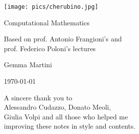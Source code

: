 \documentclass[preview,12pt]{article}
\begin{document}
\begin{titlepage}
\begin{center}
\vspace{3cm}

\Large

\vspace{2cm}

\texttt{[image: pics/cherubino.jpg]}

\vspace{2.5cm}

{\Huge \sc Computational Mathematics}

\vspace{2cm}
Based on prof. Antonio Frangioni's and\\
  prof. Federico Poloni's lectures

\vspace{2cm}
Gemma Martini
\vfill

\today

\end{center}
\end{titlepage}


\phantom{pippo}
\vspace{5cm}
\begin{flushleft}
A sincere thank you to\\
Alessandro Cudazzo, Donato Meoli,\\
Giulia Volpi and all those who helped me\\
improving these notes in style and contents.\\
\end{flushleft}
\newpage

\shipout\null

\tableofcontents
\let\tableofcontents\relax

\newpage



\newpage



\newpage



\newpage



\newpage


\end{document}
